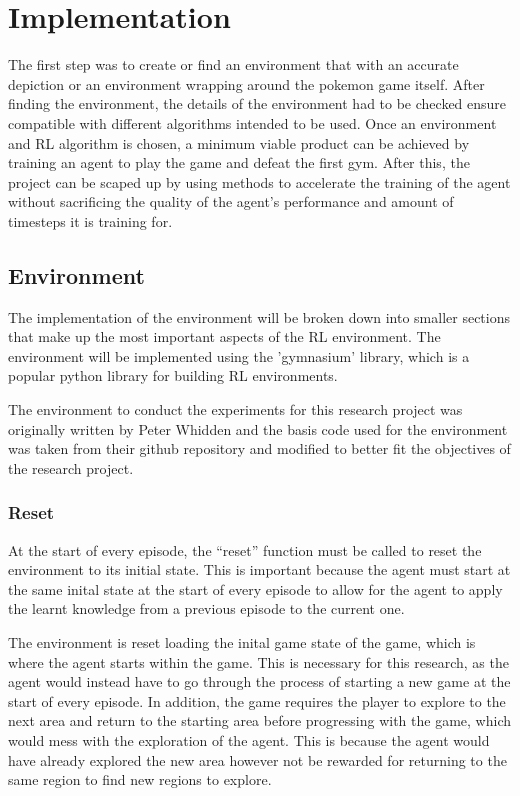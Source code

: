 \section{Implementation}

The first step was to create or find an environment that with an accurate depiction or an environment wrapping around the pokemon game itself. After finding the environment, the details of the environment had to be checked ensure compatible with different algorithms intended to be used. Once an environment and RL algorithm is chosen, a minimum viable product can be achieved by training an agent to play the game and defeat the first gym. After this,  the project can be scaped up by using methods to accelerate the training of the agent without sacrificing the quality of the agent's performance and amount of timesteps it is training for. 

\subsection{Environment}

The implementation of the environment will be broken down into smaller sections that make up the most important aspects of the RL environment. The environment will be implemented using the 'gymnasium' library, which is a popular python library for building RL environments.

The environment to conduct the experiments for this research project was originally written by Peter Whidden and the basis code used for the environment was taken from their github repository and modified to better fit the objectives of the research project. 

\subsubsection*{Reset}

At the start of every episode, the ``reset'' function must be called to reset the environment to its initial state. This is important because the agent must start at the same inital state at the start of every episode to allow for the agent to apply the learnt knowledge from a previous episode to the current one. 

The environment is reset loading the inital game state of the game, which is where the agent starts within the game. This is necessary for this research, as the agent would instead have to go through the process of starting a new game at the start of every episode. In addition, the game requires the player to explore to the next area and return to the starting area before progressing with the game, which would mess with the exploration of the agent. This is because the agent would have already explored the new area however not be rewarded for returning to the same region to find new regions to explore.

